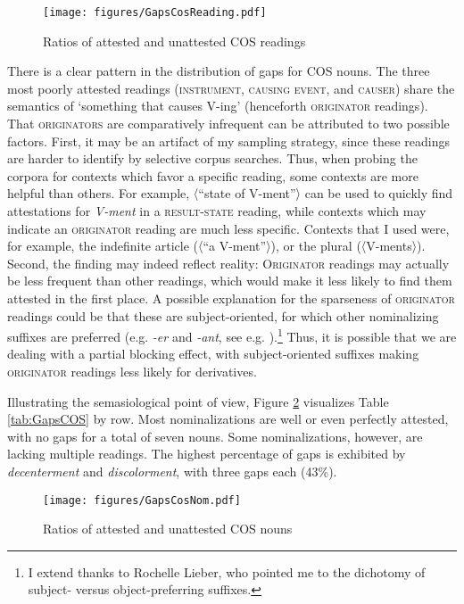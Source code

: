 \begin{figure}[t]
	\texttt{[image: figures/GapsCosReading.pdf]}
	\caption{Ratios of attested and unattested COS readings}
	\label{fig:GapsByReadingCOS}
\end{figure}

There is a clear pattern in the distribution of gaps for COS nouns. The three most poorly attested readings (\textsc{instrument, causing event,} and \textsc{causer}) share the semantics of `something that causes V-ing' (henceforth \textsc{originator} readings). That \textsc{originators} are comparatively infrequent can be attributed to two possible factors. First, it may be an artifact of my sampling strategy, since these readings are harder to identify by selective corpus searches. Thus, when probing the corpora for contexts which favor a specific reading, some contexts are more helpful than others. For example, 〈``state of V-ment''〉 can be used to quickly find attestations for \textit{V-ment} in a \textsc{result-state} reading, while contexts which may indicate an \textsc{originator} reading are much less specific. Contexts that I used were, for example, the indefinite article (〈``a V-ment''〉), or the plural (〈V-ments〉). 
Second, the finding may indeed reflect reality: \textsc{Originator} readings may actually be less frequent than other \ment{} readings, which would make it less likely to find them attested in the first place. A possible explanation for the sparseness of \textsc{originator} readings could be that these are subject-oriented, for which other nominalizing suffixes are preferred (e.g. \textit{-er} and \textit{-ant}, see e.g. \citealt{Lieber.2004}).\footnote{I extend thanks to Rochelle Lieber, who pointed me to the dichotomy of subject- versus object-preferring suffixes.} Thus, it is possible that we are dealing with a partial blocking effect, with subject-oriented suffixes making \textsc{originator} readings less likely for \ment{} derivatives.

Illustrating the semasiological point of view, Figure \ref{fig:GapsByNomCOS} visualizes Table \ref{tab:GapsCOS} by row. Most nominalizations are well or even perfectly attested, with no gaps for a total of seven nouns. Some nominalizations, however, are lacking multiple readings. The highest percentage of gaps is exhibited by \textit{decenterment} and \textit{discolorment}, with three gaps each (43\%). 

\begin{figure}
	\texttt{[image: figures/GapsCosNom.pdf]}
	\caption{Ratios of attested and unattested COS nouns}
	\label{fig:GapsByNomCOS}
\end{figure}
	
